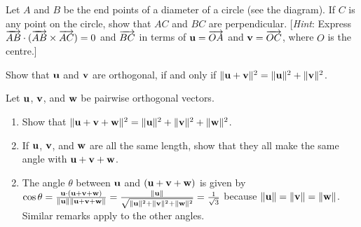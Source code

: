 \begin{multicols}{2}
\begin{ex}
Let $A$ and $B$ be the end points of a diameter of a circle (see the diagram). If $C$ is any point on the circle, show that $AC$ and $BC$ are perpendicular. [\textit{Hint}: Express $\overrightarrow{AB} \cdot (\overrightarrow{AB} \times \overrightarrow{AC}) = 0$ and $\overrightarrow{BC}$ in terms of $\textbf{u} = \overrightarrow{OA}$ and $\textbf{v} = \overrightarrow{OC}$, where $O$ is the centre.]


\begin{figure}[H]
\centering

\end{figure}
\end{ex}

\begin{ex}
Show that $\textbf{u}$ and $\textbf{v}$ are orthogonal, if and only if $\|\textbf{u} + \textbf{v}\|^{2} = \|\textbf{u}\|^{2} + \|\textbf{v}\|^{2}$.
\end{ex}

\begin{ex}
Let $\textbf{u}$, $\textbf{v}$, and $\textbf{w}$ be pairwise orthogonal vectors.


\begin{enumerate}[label={\alph*.}]
\item Show that $\|\textbf{u} + \textbf{v} + \textbf{w}\|^{2} = \|\textbf{u}\|^{2} + \|\textbf{v}\|^{2} + \|\textbf{w}\|^{2}$.

\item If $\textbf{u}$, $\textbf{v}$, and $\textbf{w}$ are all the same length, show that they all make the same angle with $\textbf{u} + \textbf{v} + \textbf{w}$.

\end{enumerate}
\begin{sol}
\begin{enumerate}[label={\alph*.}]
\setcounter{enumi}{1}
\item  The angle $\theta$ between $\textbf{u}$ and $(\textbf{u} + \textbf{v} + \textbf{w})$ is given by $\cos\theta = \tfrac{\textbf{u} \cdot (\textbf{u} + \textbf{v} + \textbf{w})}{\| \textbf{u} \| \| \textbf{u} + \textbf{v} + \textbf{w} \|} = \tfrac{\| \textbf{u} \|}{\sqrt{\| \textbf{u} \|^2 + \| \textbf{v} \|^2 + \| \textbf{w} \|^2}} = \tfrac{1}{\sqrt{3}}$ because $\| \textbf{u} \| = \| \textbf{v} \| = \| \textbf{w} \|$. Similar remarks apply to the other angles.


\end{enumerate}
\end{sol}
\end{ex}
\end{multicols}
